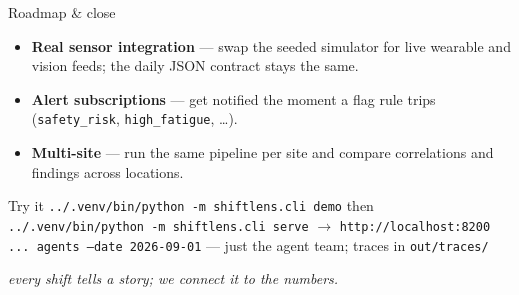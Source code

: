 \documentclass[aspectratio=169]{beamer}
\begin{document}
\begin{frame}{Roadmap \& close}
  \begin{itemize}
    \item \textbf{Real sensor integration} --- swap the seeded simulator for
          live wearable and vision feeds; the daily JSON contract stays the same.
    \item \textbf{Alert subscriptions} --- get notified the moment a flag rule
          trips (\texttt{safety\_risk}, \texttt{high\_fatigue}, \dots).
    \item \textbf{Multi-site} --- run the same pipeline per site and compare
          correlations and findings across locations.
  \end{itemize}
  \begin{block}{Try it}
    \texttt{../.venv/bin/python -m shiftlens.cli demo} \quad then \quad
    \texttt{../.venv/bin/python -m shiftlens.cli serve}
    $\rightarrow$ \texttt{http://localhost:8200}\\[3pt]
    \texttt{... agents --date 2026-09-01} --- just the agent team; traces in
    \texttt{out/traces/}
  \end{block}
  \centering\emph{every shift tells a story; we connect it to the numbers.}
\end{frame}
\end{document}
